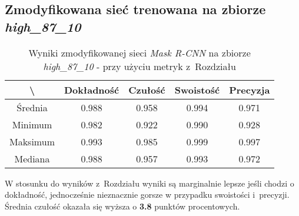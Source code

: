 \subsection{Zmodyfikowana sieć trenowana na zbiorze \textit{high\_87\_10}}
\label{sec:results_high_modified}

\begin{table}[H]
	\centering
	\caption{Wyniki zmodyfikowanej sieci \textit{Mask R-CNN} na zbiorze \textit{high\_87\_10} - przy użyciu metryk z~Rozdziału }
	\vspace{6pt}
	{\footnotesize
		\begin{tabular}{|c|c|c|c|c|}
      \hline \textbackslash & Dokładność & Czułość & Swoistość & Precyzja \\
      \hline Średnia & 0.988 & 0.958 & 0.994 & 0.971 \\
      \hline Minimum & 0.982 & 0.922 & 0.990 & 0.928 \\
      \hline Maksimum & 0.993 & 0.985 & 0.999 & 0.997 \\
      \hline Mediana & 0.988 & 0.957 & 0.993 & 0.972 \\
      \hline
		\end{tabular}
	}
  \vspace{0pt}
  \label{Tab:high_modified_calculated}
\end{table}

W stosunku do wyników z~Rozdziału  wyniki są marginalnie lepsze jeśli chodzi o dokładność, jednocześnie nieznacznie gorsze w przypadku swoistości i~precyzji. Średnia czułość okazała się wyższa o \textbf{3.8} punktów procentowych.
